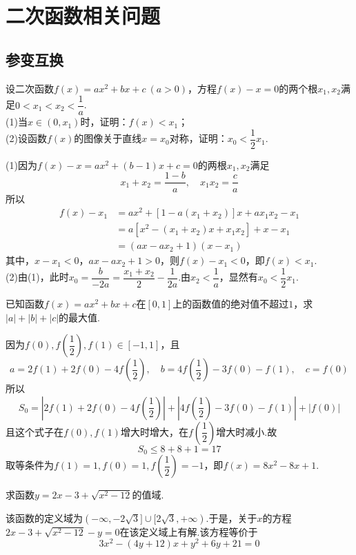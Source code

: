 \documentclass[cn,hazy,black,10pt,normal]{elegantnote}
\newcommand{\ssb}[1]{\left( #1 \right)}
\begin{document}
\section{二次函数相关问题}

\subsection{参变互换}

\begin{problem} %
	设二次函数$f(x)=ax^2+bx+c~(a>0)$，方程$f(x)-x=0$的两个根$x_1,x_2$满足$0<x_1<x_2< \dfrac{1}{a}$. \\
	(1)当$x \in (0,x_1)$时，证明：$f(x)<x_1$； \\
	(2)设函数$f(x)$的图像关于直线$x=x_0$对称，证明：$x_0 < \dfrac{1}{2}x_1$.
\end{problem}
\begin{solution}
	(1)因为$f(x)-x=ax^2+(b-1)x+c=0$的两根$x_1,x_2$满足$$x_1+x_2=\frac{1-b}{a},\quad x_1x_2=\frac{c}{a}$$
	所以
	\begin{align*}
		f(x)-x_1 &= ax^2 + [1-a(x_1+x_2)]x+ax_1x_2-x_1 \\
		&= a[x^2-(x_1+x_2)x+x_1x_2]+x-x_1 \\
		&= (ax-ax_2+1)(x-x_1)
	\end{align*}
	其中，$x-x_1<0$，$ax-ax_2+1>0$，则$f(x)-x_1<0$，即$f(x)<x_1$. \\
	(2)由(1)，此时$x_0 = \dfrac{b}{-2a} = \dfrac{x_1+x_2}{2}-\dfrac{1}{2a}$.由$x_2 < \dfrac{1}{a}$，显然有$x_0<\dfrac{1}{2}x_1$.
\end{solution}

\begin{problem} %
	已知函数$f(x)=ax^2+bx+c$在$[0,1]$上的函数值的绝对值不超过$1$，求$|a|+|b|+|c|$的最大值.
\end{problem}
\begin{solution}
	因为$f(0),f\ssb{\dfrac{1}{2}},f(1) \in [-1,1]$，且$$a = 2f(1)+2f(0)-4f\ssb{\frac{1}{2}},\quad b = 4f\ssb{\frac{1}{2}}-3f(0)-f(1),\quad c=f(0)$$
	所以$$S_0 = |2f(1)+2f(0)-4f\ssb{\frac{1}{2}}| + |4f\ssb{\frac{1}{2}}-3f(0)-f(1)| + |f(0)|$$
	且这个式子在$f(0),f(1)$增大时增大，在$f\ssb{\dfrac{1}{2}}$增大时减小.故$$S_0 \leq 8+8+1=17$$
	取等条件为$f(1)=1,f(0)=1,f\ssb{\dfrac{1}{2}}=-1$，即$f(x)=8x^2-8x+1$.
\end{solution}

\begin{problem} %
	求函数$y=2x-3+\sqrt{x^2-12}$的值域.
\end{problem}
\begin{solution}
	该函数的定义域为$(-\infty ,-2\sqrt{3}] \cup [2\sqrt{3}, +\infty )$.于是，关于$x$的方程$2x-3+\sqrt{x^2-12}-y=0$在该定义域上有解.该方程等价于$$3x^2 - (4y+12)x + y^2+6y+21 = 0$$
\end{solution}
\end{document}
